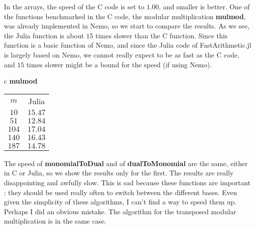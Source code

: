 \documentclass[a4paper,11pt]{article}
\theoremstyle{break}
\theoremstyle{definition}
\theoremstyle{remark}
\begin{document}
In the arrays, the speed of
the C code is set to $1.00$, and smaller is better. One of the functions 
benchmarked in the C code, the modular multiplication \textbf{mulmod}, was 
already implemented in Nemo, so we start to compare the results. As we see, the 
Julia function is about $15$ times slower than the C function. Since this 
function is a basic function of Nemo, and since the Julia code of 
FastArithmetic.jl is largely based on Nemo, we cannot really expect to be as 
fast as the C code, and $15$ times slower might be a bound for the speed (if 
using Nemo).

\begin{center}
  \begin{tabular}[here]{c}
    \textbf{mulmod} \\
    \begin{tabular}[here]{cc}
   $m$ & Julia \\
   $10$ & $15.47$\\
   $51$ & $12.84$\\
   $104$ & $17.04$\\
   $140$ & $16.43$\\
   $187$ & $14.78$\\
    \end{tabular}
  \end{tabular}
\end{center}
The speed of \textbf{monomialToDual} and of \textbf{dualToMonomial} are the 
same, either in C or Julia, so we show the results only for the first. The 
results are really disappointing and awfully slow. This is sad because these 
functions are important : they should be used really often to switch between 
the different bases. Even given the simplicity of these algorithms, I can't 
find a way to speed them up. Perhaps I did an obvious mistake. The algorithm 
for the transposed modular multiplication is in the same case. 
\end{document}
